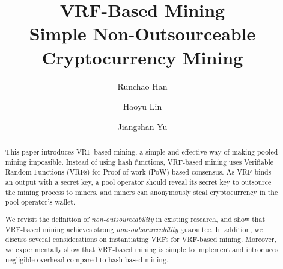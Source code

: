 \documentclass[runningheads]{llncs}
\begin{document}
\title{
  VRF-Based Mining\\
  \large Simple Non-Outsourceable Cryptocurrency Mining
}


\author{%
Runchao Han  \and 
Haoyu Lin \and
Jiangshan Yu
}

\maketitle

\begin{abstract}
  This paper introduces VRF-based mining, a simple and effective way of making pooled mining impossible.
  Instead of using hash functions, VRF-based mining uses Verifiable Random Functions (VRFs) for Proof-of-work (PoW)-based consensus.
  As VRF binds an output with a secret key, a pool operator should reveal its secret key to outsource the mining process to miners, and miners can anonymously steal cryptocurrency in the pool operator's wallet.
  
  We revisit the definition of \emph{non-outsourceability} in existing research, and show that VRF-based mining achieves strong \emph{non-outsourceability} guarantee.
  In addition, we discuss several considerations on instantiating VRFs for VRF-based mining.
  Moreover, we experimentally show that VRF-based mining is simple to implement and introduces negligible overhead compared to hash-based mining.
\end{abstract}















\appendix

\end{document}
